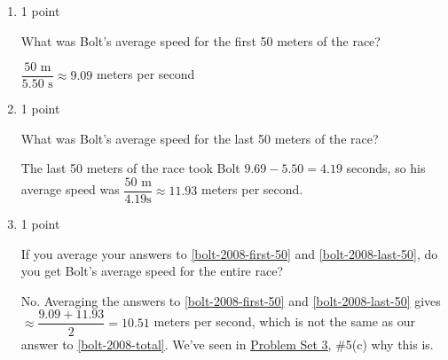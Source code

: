 \documentclass{article}
\makeatletter
\let\@href=\href
\renewcommand{\href}[2]{\@href{#1}{\ul{#2}}}
\makeatother
\begin{document}
\begin{enumerate}
\begin{enumerate}
  \item \label{bolt-2008-first-50}

    \begin{grading}
      1 point
    \end{grading}

    \begin{problem}[\vfill]
      What was Bolt's average speed for the first 50 meters of the race?
    \end{problem}

    \begin{solution} %
      $\dfrac{50 \text{ m}}{5.50 \text{ s}} \approx 9.09$ meters per
      second 
    \end{solution}

  \item \label{bolt-2008-last-50}

    \begin{grading}
      1 point
    \end{grading}

    \begin{problem}[\vfill]
      What was Bolt's average speed for the last 50 meters of the race?
    \end{problem}

    \begin{solution} %
      The last 50 meters of the race took Bolt $9.69 - 5.50 = 4.19$
      seconds, so his average speed was $\dfrac{50 \text{ m}}{4.19 \text{
          s}} \approx 11.93$ meters per second.
    \end{solution}

  \item

    \begin{grading}
      1 point
    \end{grading}

    \begin{problem}[\stretch{1.25}]
      If you average your answers to \ref{bolt-2008-first-50} and
      \ref{bolt-2008-last-50}, do you get Bolt's average speed for the
      entire race?
    \end{problem}

    \begin{solution} %
      No. Averaging the answers to \ref{bolt-2008-first-50} and
      \ref{bolt-2008-last-50} gives $\approx \dfrac{9.09 + 11.93}{2} =
      10.51$ meters per second, which is not the same as our answer to
      \ref{bolt-2008-total}. We've seen in
      \href{https://people.math.harvard.edu/~jjchen/mathma/docs/homework/PS03.html}{Problem Set 3}, {{{{\#5}}(c)}} why this is.
    \end{solution}


\end{enumerate}
\end{enumerate}
\end{document}
